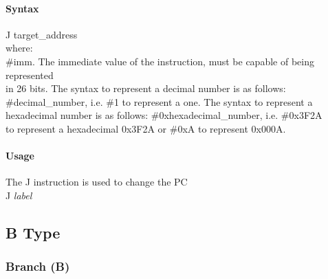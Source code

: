 \documentclass[12pt]{article}
\begin{document}
    \paragraph{Syntax}
    \begin{flushleft}
    J target\_address\\ 
    \vspace{1em}        %
    where:\\
    \vspace{1em}
    \#imm.  \hspace{1.8em} The immediate value of the instruction, must be capable of being represented\\             \hspace{5.4em} in 26 bits. The syntax to represent a decimal number is as follows:\\
            \hspace{5.4em} \#decimal\_number, i.e. \#1 to represent a one. The syntax to represent a\\
            \hspace{5.4em} hexadecimal number is as follows: \#0xhexadecimal\_number, i.e. \#0x3F2A \\
            \hspace{5.4em} to represent a hexadecimal 0x3F2A or \#0xA to represent 0x000A.\\
    \end{flushleft}
    
    \paragraph{Usage}
    \begin{flushleft}
    The J instruction is used to change the PC \\
    \vspace{1em}
    J \textit{label} 
    \end{flushleft}

\newpage
\subsection{B Type}

\subsubsection{Branch (B)}
    
\end{document}
